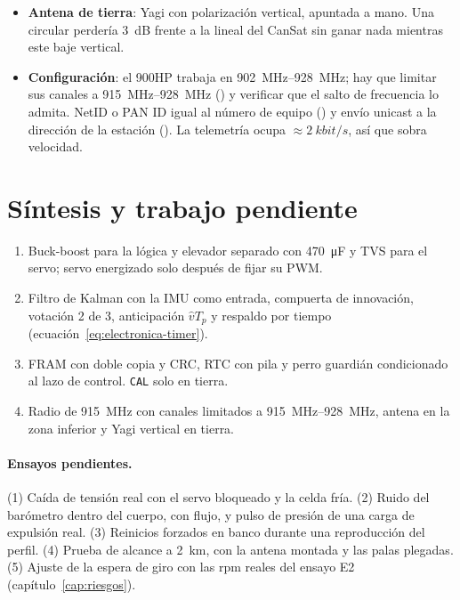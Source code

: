 \begin{itemize}
        que el margen del enlace (\SI{27.8}{dB} en el nulo con SF7) absorbe. Las aletas son de
        carbono o de FR-4: si son de carbono, su bisagra y el resorte quedan a más de
        \SI{10}{mm} de la hélice, o se usa FR-4 y no hay problema. No puede sobresalir, porque 
        limita el largo total. Comparte la zona con la baliza, la cámara y el lastre: el
        lastre metálico debe quedar lejos de la hélice (o ser no conductor), porque la
        desintoniza.
  \item \textbf{Antena de tierra}: Yagi con polarización vertical, apuntada a mano. Una
        circular perdería \SI{3}{dB} frente a la lineal del CanSat sin ganar nada mientras
        este baje vertical.
  \item \textbf{Configuración}: el 900HP trabaja en \SIrange{902}{928}{MHz}; hay que
        limitar sus canales a \SIrange{915}{928}{MHz} () y verificar que el salto de
        frecuencia lo admita. NetID o PAN ID igual al número de equipo () y envío
        unicast a la dirección de la estación (). La telemetría ocupa
        $\approx\SI{2}{kbit/s}$, así que sobra velocidad.
\end{itemize}

\section{Síntesis y trabajo pendiente}\label{sec:electronica-sintesis}

\begin{resultado}[Recomendaciones]
\begin{enumerate}[leftmargin=*]
  \item Buck-boost para la lógica y elevador separado con \SI{470}{\micro F} y TVS para el
        servo; servo energizado solo después de fijar su PWM.
  \item Filtro de Kalman con la IMU como entrada, compuerta de innovación, votación 2 de 3,
        anticipación $\hat vT_p$ y respaldo por tiempo (ecuación~\ref{eq:electronica-timer}).
  \item FRAM con doble copia y CRC, RTC con pila y perro guardián condicionado al lazo de
        control. \texttt{CAL} solo en tierra.
  \item Radio de \SI{915}{MHz} con canales limitados a \SIrange{915}{928}{MHz}, antena en la
        zona inferior y Yagi vertical en tierra.
\end{enumerate}
\end{resultado}

\paragraph{Ensayos pendientes.} (1) Caída de tensión real con el servo bloqueado y la celda
fría. (2) Ruido del barómetro dentro del cuerpo, con flujo, y pulso de presión de una carga
de expulsión real. (3) Reinicios forzados en banco durante una reproducción del perfil.
(4) Prueba de alcance a \SI{2}{km}, con la antena montada y las palas plegadas. (5) Ajuste
de la espera de giro con las rpm reales del ensayo E2 (capítulo~\ref{cap:riesgos}).
